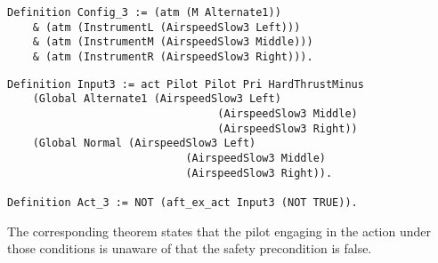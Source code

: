 \begin{tcolorbox}\begin{lstlisting}[language=Coq]
Definition Config_3 := (atm (M Alternate1))
	& (atm (InstrumentL (AirspeedSlow3 Left)))
	& (atm (InstrumentM (AirspeedSlow3 Middle)))
	& (atm (InstrumentR (AirspeedSlow3 Right))).
	\end{lstlisting}
\end{tcolorbox}

\begin{tcolorbox}\begin{lstlisting}[language=Coq]
Definition Input3 := act Pilot Pilot Pri HardThrustMinus
	(Global Alternate1 (AirspeedSlow3 Left) 
								 (AirspeedSlow3 Middle) 
								 (AirspeedSlow3 Right))
	(Global Normal (AirspeedSlow3 Left) 
							(AirspeedSlow3 Middle) 
							(AirspeedSlow3 Right)).
	
Definition Act_3 := NOT (aft_ex_act Input3 (NOT TRUE)).
	\end{lstlisting}
\end{tcolorbox}

The corresponding theorem states that the pilot engaging in the action under those conditions is unaware of that the safety precondition is false.

